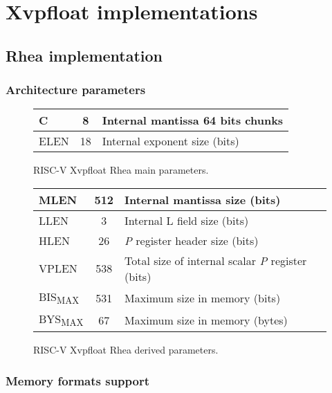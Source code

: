 \chapter{Xvpfloat implementations}

\section{Rhea implementation}

\subsection{Architecture parameters}

\begin{figure}[ht]
\begin{center}
    \begin{tabular}{|l|c|p{4in}|}
    \hline
    C & 8 & Internal mantissa 64 bits chunks \\
    \hline
    ELEN & 18 & Internal exponent size (bits)\\
    \hline
    \end{tabular}
\end{center}
\caption{RISC-V Xvpfloat Rhea main parameters.}
\label{fig:Xvpfloat_rhea_main_params}
\end{figure}

\begin{figure}[ht]
\begin{center}
    \begin{tabular}{|l|c|p{4in}|}
    \hline
    MLEN & 512 & Internal mantissa size (bits) \\
    \hline
    LLEN & 3 & Internal L field size (bits)\\
    \hline
    HLEN & 26 & {\em P} register header size (bits)\\
    \hline
    VPLEN & 538 & Total size of internal scalar {\em P} register (bits)\\
    \hline
    BIS\textsubscript{MAX} & 531 & Maximum size in memory (bits)\\
    \hline
    BYS\textsubscript{MAX} & 67 & Maximum size in memory (bytes)\\
    \hline
    \end{tabular}
\end{center}
\caption{RISC-V Xvpfloat Rhea derived parameters.}
\label{fig:Xvpfloat_rhea_derived_params}
\end{figure}

\subsection{Memory formats support}

